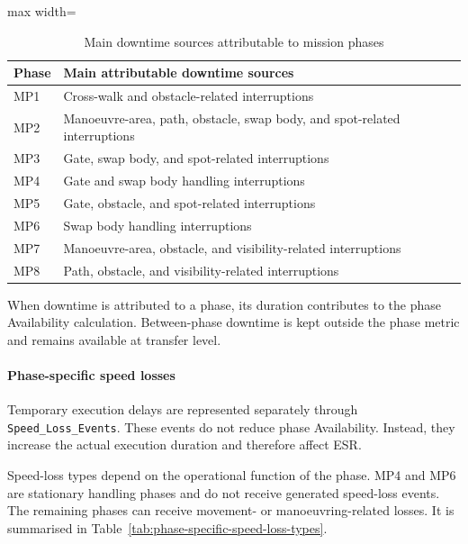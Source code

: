\begin{table}[htbp]
\small
\renewcommand{\arraystretch}{1.15}
\centering
\caption{Main downtime sources attributable to mission phases}
\label{tab:phase-attributed-downtime-sources}
\begin{adjustbox}{max width=\textwidth}
\begin{tabular}{|p{1.0cm}|p{13.2cm}|}
\hline
\textbf{Phase} & \textbf{Main attributable downtime sources} \\
\hline
MP1 & Cross-walk and obstacle-related interruptions \\
\hline
MP2 & Manoeuvre-area, path, obstacle, swap body, and spot-related interruptions \\
\hline
MP3 & Gate, swap body, and spot-related interruptions \\
\hline
MP4 & Gate and swap body handling interruptions \\
\hline
MP5 & Gate, obstacle, and spot-related interruptions \\
\hline
MP6 & Swap body handling interruptions \\
\hline
MP7 & Manoeuvre-area, obstacle, and visibility-related interruptions \\
\hline
MP8 & Path, obstacle, and visibility-related interruptions \\
\hline
\end{tabular}
\end{adjustbox}
\end{table}

When downtime is attributed to a phase, its duration contributes to the phase Availability calculation. Between-phase downtime is kept outside the phase metric and remains available at transfer level.

\paragraph*{Phase-specific speed losses}
Temporary execution delays are represented separately through \texttt{Speed\_Loss\_Events}. These events do not reduce phase Availability. Instead, they increase the actual execution duration and therefore affect ESR.

Speed-loss types depend on the operational function of the phase. MP4 and MP6 are stationary handling phases and do not receive generated speed-loss events. The remaining phases can receive movement- or manoeuvring-related losses. It is summarised in Table~\ref{tab:phase-specific-speed-loss-types}.

